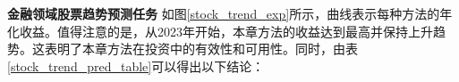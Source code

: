 \textbf{金融领域股票趋势预测任务} 如图\ref{stock_trend_exp}所示，曲线表示每种方法的年化收益。值得注意的是，从2023年开始，本章方法的收益达到最高并保持上升趋势。这表明了本章方法在投资中的有效性和可用性。同时，由表\ref{stock_trend_pred_table}可以得出以下结论：


